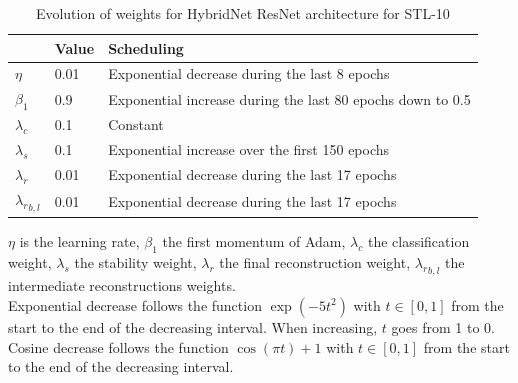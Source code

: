 \begin{table}[htbp]
\centering
\caption{Evolution of weights for HybridNet ResNet architecture for STL-10}
\label{hybridnetA:table:resnetschedstl}
\begin{threeparttable}
\setlength{\tabcolsep}{4pt}
\begin{tabular}{ l l l}
\toprule
    & Value & Scheduling \\
\midrule
$\eta$ & 0.01 & Exponential decrease during the last 8 epochs \\
$\beta_1$ & 0.9 & Exponential increase during the last 80 epochs down to 0.5 \\
$\lambda_c$ & 0.1 & Constant \\
$\lambda_s$ & 0.1 & Exponential increase over the first 150 epochs \\
$\lambda_r$ & 0.01 & Exponential decrease during the last 17 epochs \\
${\lambda_r}_{b,l}$ & 0.01 & Exponential decrease during the last 17 epochs \\
\bottomrule
\end{tabular}
\begin{tablenotes}
$\eta$ is the learning rate, $\beta_1$ the first momentum of Adam, $\lambda_c$ the classification weight, $\lambda_s$ the stability weight, $\lambda_r$ the final reconstruction weight, ${\lambda_r}_{b,l}$ the intermediate reconstructions weights.\\
Exponential decrease follows the function $\exp(-5t^2)$ with $t\in[0,1]$ from the start to the end of the decreasing interval. When increasing, $t$ goes from 1 to 0.\\
Cosine decrease follows the function $\cos(\pi t)+1$ with $t\in[0,1]$ from the start to the end of the decreasing interval.
\end{tablenotes}
\end{threeparttable}
\end{table}
